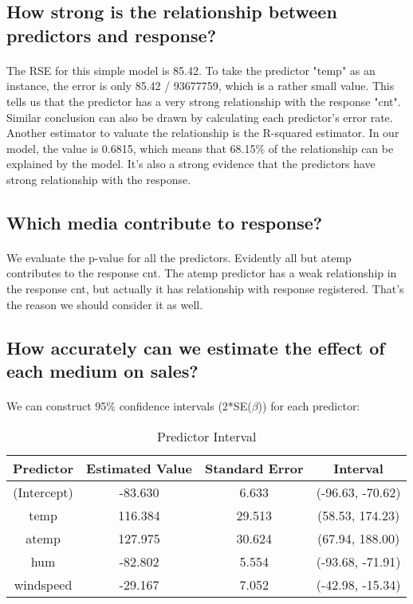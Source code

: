 \documentclass{article}[]
\begin{document}
\subsection{How strong is the relationship between predictors and response?}
\paragraph{}
The RSE for this simple model is 85.42. To take the predictor "temp" as an instance, the error is only 85.42 / 93677759, which is a rather small value. This tells us that the predictor has a very strong relationship with the response "cnt". Similar conclusion can also be drawn by calculating each predictor's error rate. Another estimator to valuate the relationship is the R-squared estimator. In our model, the value is 0.6815, which means that 68.15\% of the
relationship can be explained by the model. It's also a strong evidence that the predictors have strong relationship with the response.

\subsection{Which media contribute to response?}
\paragraph{}
We evaluate the p-value for all the predictors. Evidently all but atemp contributes to the response cnt. The atemp predictor has a weak relationship in the response cnt, but actually it has relationship with response registered. That's the reason we should consider it as well.

\subsection{How accurately can we estimate the effect of each medium on sales?}
\paragraph{}
We can construct 95\% confidence intervals (2*SE($\beta$)) for each predictor:

\begin{table}
\caption{Predictor Interval}
\centering
\begin{tabular}{c|c|c|c}
\hline
{\bf Predictor}&{\bf Estimated Value}&{\bf Standard Error}&{\bf Interval}\\
\hline
(Intercept)  &-83.630      &6.633 &(-96.63, -70.62)\\
temp         &116.384     &29.513 &(58.53, 174.23)\\
atemp        &127.975     &30.624 &(67.94, 188.00)\\
hum          &-82.802      &5.554 &(-93.68, -71.91)\\
windspeed    &-29.167      &7.052 &(-42.98, -15.34)\\
\hline
\end{tabular}
\label{table:predictor_interval_table}
\end{table}
\end{document}
